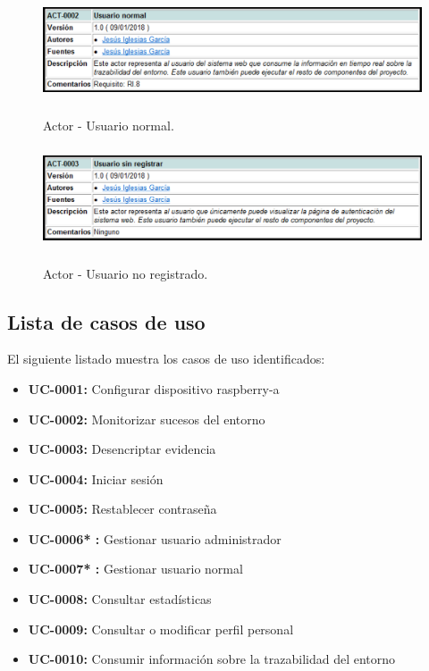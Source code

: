 \documentclass[12pt,a4paper, twoside]{report}
\begin{document}
	\newpage
	
	\begin{figure}[!ht]   
		\caption{Actor - Usuario normal.} 
		\begin{center} 
	 		\includegraphics[width=14cm,height=3cm]{Images/analysis/actors/actor_normal} \\
			\label{fig:actor_02} 
		\end{center}  
	\end{figure} 
	
	\begin{figure}[!ht]   
		\caption{Actor - Usuario no registrado.} 
		\begin{center} 
	 		\includegraphics[width=14cm,height=3cm]{Images/analysis/actors/actor_noregistrado} \\
			\label{fig:actor_03} 
		\end{center}  
	\end{figure} 
	
	\subsection{Lista de casos de uso} \label{UClist}
	
	El siguiente listado muestra los casos de uso identificados:
	
	\begin{itemize}
		\item \textbf{UC-0001:} Configurar dispositivo \gls{raspberry-a}
		\item \textbf{UC-0002:} Monitorizar sucesos del entorno
		\item \textbf{UC-0003:} Desencriptar evidencia
		\item \textbf{UC-0004:} Iniciar sesión
		\item \textbf{UC-0005:} Restablecer contraseña 
		\item \textbf{UC-0006{\color{black!40!blue}*} :} Gestionar usuario administrador
		\item \textbf{UC-0007{\color{black!40!blue}*} :} Gestionar usuario normal
		\item \textbf{UC-0008:} Consultar estadísticas
		\item \textbf{UC-0009:} Consultar o modificar perfil personal
		\item \textbf{UC-0010:} Consumir información sobre la trazabilidad del entorno
	\end{itemize}
	
\end{document}
